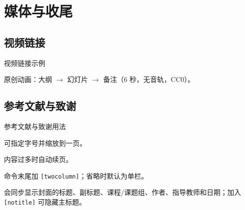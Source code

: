 \section{媒体与收尾}
\subsection{视频链接}

\begin{frame}{视频链接示例}
      \centering
      \href{run:../assets/presentation_demo.mp4}{%
      }
      \par\medskip
      {\small 原创动画：大纲 \(\rightarrow\) 幻灯片 \(\rightarrow\) 备注（6 秒，无音轨，CC0）。}
\end{frame}

\subsection{参考文献与致谢}

\begin{frame}[fragile]{参考文献与致谢用法}
      \begin{description}[汇总单页]
            \item[汇总单页] \texttt{\string{}} 可指定字号并缩放到一页。
            \item[汇总续页] \texttt{\string{}} 内容过多时自动续页。
            \item[双栏汇总] 命令末尾加 \texttt{[twocolumn]}；省略时默认为单栏。
            \item[致谢页面] \texttt{\string\backmatter} 会同步显示封面的标题、副标题、课程/课题组、作者、指导教师和日期；加入 \texttt{[notitle]} 可隐藏主标题。
      \end{description}
\end{frame}

